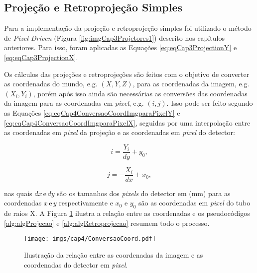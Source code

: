 \subsection{Projeção e Retroprojeção Simples} 

Para a implementação da projeção e retroprojeção simples foi utilizado o método de \textit{Pixel Driven} (Figura \ref{fig:imgCap3Projetores1}) descrito nos capítulos anteriores. Para isso, foram aplicadas as Equações \ref{eq:eqCap3ProjectionY} e \ref{eq:eqCap3ProjectionX}.

 Os cálculos das projeções e retroprojeções são feitos com o objetivo de converter as coordenadas do mundo, e.g. $(X,Y,Z)$, para as coordenadas da imagem, e.g. $(X_{i},Y_{i})$, porém após isso ainda são necessárias as conversões das coordenadas da imagem para as coordenadas em \textit{pixel}, e.g. $(i,j)$. Isso pode ser feito segundo as Equações \ref{eq:eqCap4ConversaoCoordImgparaPixelY} e \ref{eq:eqCap4ConversaoCoordImgparaPixelX}, seguidas por uma interpolação entre as coordenadas em \textit{pixel} da projeção e as coordenadas em \textit{pixel} do detector:
 
 \begin{equation}
 i = \dfrac{Y_{i}}{dy} + y_{0},  
 \label{eq:eqCap4ConversaoCoordImgparaPixelY}
 \end{equation} 
 
 \begin{equation}
 j = -\dfrac{X_{i}}{dx} + x_{0},
 \label{eq:eqCap4ConversaoCoordImgparaPixelX}
 \end{equation} 
 
 \noindent nas quais $dx\,\text{e}\,dy$ são os tamanhos dos \textit{pixels} do detector em (mm) para as coordenadas $x\,\text{e}\,y$ respectivamente e $x_{0}$ e $y_{0}$ são as coordenadas em \textit{pixel} do tubo de raios X. A Figura \ref{fig:imgCap4ConversaoCoord} ilustra a relação entre as coordenadas e os pseudocódigos \ref{alg:algProjecao} e \ref{alg:algRetroprojecao} resumem todo o processo.  
 
 \begin{figure}[htb]
 	\caption{Ilustração da relação entre as coordenadas da imagem e as coordenadas do detector em \textit{pixel}.}
 	\begin{center}
 		\texttt{[image: imgs/cap4/ConversaoCoord.pdf]}
 	\end{center}
 	\label{fig:imgCap4ConversaoCoord}
\end{figure} 

